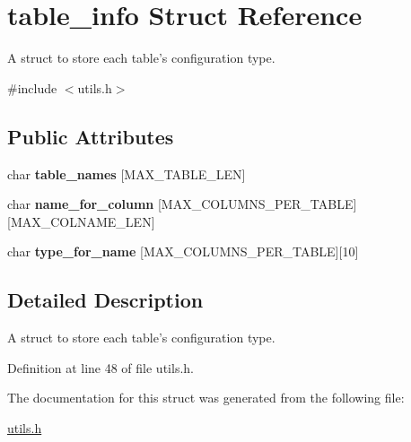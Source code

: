 \hypertarget{structtable__info}{
\section{table\_\-info Struct Reference}
\label{structtable__info}
}


A struct to store each table's configuration type.  




{\ttfamily \#include $<$utils.h$>$}

\subsection*{Public Attributes}
\begin{DoxyCompactItemize}
\item 
\hypertarget{structtable__info_a3a4984206f6a02f5a1bb660314a832c9}{
char {\bfseries table\_\-names} \mbox{[}MAX\_\-TABLE\_\-LEN\mbox{]}}
\label{structtable__info_a3a4984206f6a02f5a1bb660314a832c9}

\item 
\hypertarget{structtable__info_a1474a81918a60297ef90ee8a8442511d}{
char {\bfseries name\_\-for\_\-column} \mbox{[}MAX\_\-COLUMNS\_\-PER\_\-TABLE\mbox{]}\mbox{[}MAX\_\-COLNAME\_\-LEN\mbox{]}}
\label{structtable__info_a1474a81918a60297ef90ee8a8442511d}

\item 
\hypertarget{structtable__info_a316fd59aa8381dfb3d325b5e8f14186e}{
char {\bfseries type\_\-for\_\-name} \mbox{[}MAX\_\-COLUMNS\_\-PER\_\-TABLE\mbox{]}\mbox{[}10\mbox{]}}
\label{structtable__info_a316fd59aa8381dfb3d325b5e8f14186e}

\end{DoxyCompactItemize}


\subsection{Detailed Description}
A struct to store each table's configuration type. 

Definition at line 48 of file utils.h.



The documentation for this struct was generated from the following file:\begin{DoxyCompactItemize}
\item 
\hyperlink{utils_8h}{utils.h}\end{DoxyCompactItemize}
